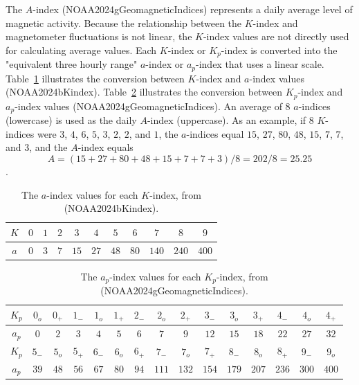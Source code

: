 \documentclass[sn-mathphys-num]{sn-jnl}%
\begin{document}
The $A$-index (NOAA2024gGeomagneticIndices) represents a daily average level of magnetic activity. Because the relationship between the $K$-index and magnetometer fluctuations is not linear, the $K$-index values are not directly used for calculating average values. Each $K$-index or $K_{p}$-index is converted into the "equivalent three hourly range" $a$-index or $a_{p}$-index that uses a linear scale. Table~\ref{tab:a} illustrates the conversion between $K$-index and $a$-index values (NOAA2024bKindex). Table~\ref{tab:ap} illustrates the conversion between $K_{p}$-index and $a_{p}$-index values (NOAA2024gGeomagneticIndices). An average of $8$ $a$-indices (lowercase) is used as the daily $A$-index (uppercase). As an example, if $8$ $K$-indices were $3$, $4$, $6$, $5$, $3$, $2$, $2$, and $1$, the $a$-indices equal $15$, $27$, $80$, $48$, $15$, $7$, $7$, and $3$, and the $A$-index equals \begin{equation}
	A = (15 + 27 + 80 + 48 + 15 + 7 + 7 + 3)/8 = 202 / 8 = 25.25
	\label{eqn:6}
\end{equation}.

\begin{table}[!ht]
    \centering
    \caption{The $a$-index values for each $K$-index, from (NOAA2024bKindex).}
    \label{tab:a}
    \begin{tabular}{|c|c|c|c|c|c|c|c|c|c|c|}
        \hline
        $K$ & $0$ & $1$ & $2$ & $3$ & $4$ & $5$ & $6$ & $7$ & $8$ & $9$ \\ \hline
        $a$ & $0$ & $3$ & $7$ & $15$ & $27$ & $48$ & $80$ & $140$ & $240$ & $400$ \\ \hline
    \end{tabular}
\end{table}

\begin{table}[!ht]
    \centering
    \caption{The $a_{p}$-index values for each $K_{p}$-index, from (NOAA2024gGeomagneticIndices).}
    \label{tab:ap}
    \begin{tabular}{|c|c|c|c|c|c|c|c|c|c|c|c|c|c|c|}
        \hline
        $K_{p}$ & $0_{o}$ & $0_{+}$ & $1_{-}$ & $1_{o}$ & $1_{+}$ & $2_{-}$ & $2_{o}$ & $2_{+}$ & $3_{-}$ & $3_{o}$ & $3_{+}$ & $4_{-}$ & $4_{o}$ & $4_{+}$ \\ \hline
        $a_{p}$ & $0$ & $2$ & $3$ & $4$ & $5$ & $6$ & $7$ & $9$ & $12$ & $15$ & $18$ & $22$ & $27$ & $32$ \\ \hline
        $K_{p}$ & $5_{-}$ & $5_{o}$ & $5_{+}$ & $6_{-}$ & $6_{o}$ & $6_{+}$ & $7_{-}$ & $7_{o}$ & $7_{+}$ & $8_{-}$ & $8_{o}$ & $8_{+}$ & $9_{-}$ & $9_{o}$ \\ \hline
        $a_{p}$ & $39$ & $48$ & $56$ & $67$ & $80$ & $94$ & $111$ & $132$ & $154$ & $179$ & $207$ & $236$ & $300$ & $400$ \\ \hline
 \end{tabular}
\end{table}
\end{document}
